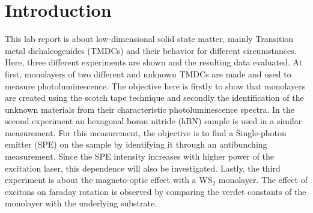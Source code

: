 \section{Introduction}

  This lab report is about low-dimensional solid state matter, mainly Transition metal dichalcogenides (TMDCs) and their behavior for different circumstances.
  Here, three different experiments are shown and the resulting data evaluated.
  At first, monolayers of two different and unknown TMDCs are made and used to measure photoluminescence.
  The objective here is firstly to show that monolayers are created using the scotch tape technique and secondly the identification of the unknown materials from their characteristic photoluminescence spectra.
  In the second experiment an hexagonal boron nitride (hBN) sample is used in a similar measurement.
  For this measurement, the objective is to find a Single-photon emitter (SPE) on the sample by identifying it through an antibunching measurement.
  Since the SPE intensity increases with higher power of the excitation laser, this dependence will also be investigated.
  Lastly, the third experiment is about the magneto-optic effect with a WS$_2$ monolayer.
  The effect of excitons on faraday rotation is observed by comparing the verdet constants of the monolayer with the underlying substrate.


